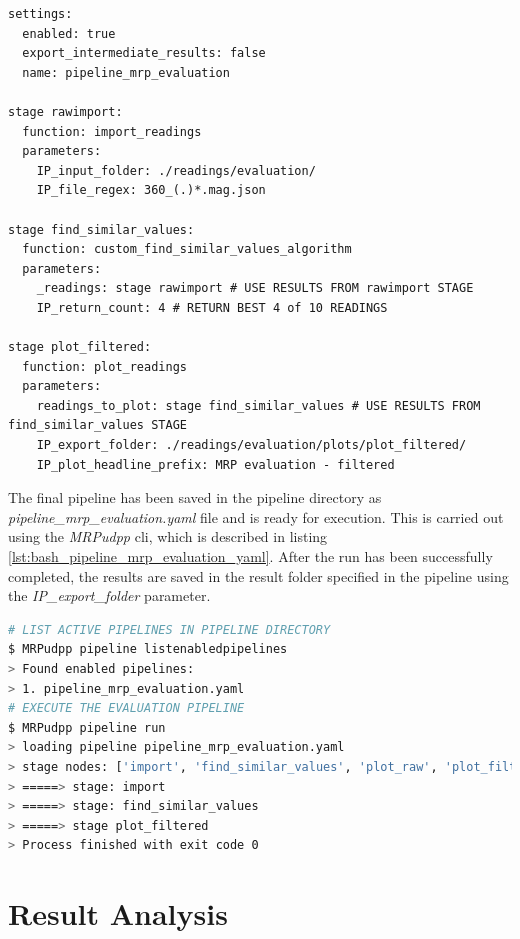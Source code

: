 \begin{lstlisting}[caption={User defined processing pipeline using custom implemented filter algorithm in third stage}, label=lst:pipeline_mrp_evaluation_yaml]
settings:
  enabled: true
  export_intermediate_results: false
  name: pipeline_mrp_evaluation

stage rawimport:
  function: import_readings
  parameters:
    IP_input_folder: ./readings/evaluation/
    IP_file_regex: 360_(.)*.mag.json

stage find_similar_values:
  function: custom_find_similar_values_algorithm
  parameters:
    _readings: stage rawimport # USE RESULTS FROM rawimport STAGE
    IP_return_count: 4 # RETURN BEST 4 of 10 READINGS

stage plot_filtered:
  function: plot_readings
  parameters:
    readings_to_plot: stage find_similar_values # USE RESULTS FROM find_similar_values STAGE
    IP_export_folder: ./readings/evaluation/plots/plot_filtered/
    IP_plot_headline_prefix: MRP evaluation - filtered
\end{lstlisting}

The final pipeline has been saved in the pipeline directory as
\emph{pipeline\_mrp\_evaluation.yaml} file and is ready for execution.
This is carried out using the \emph{MRPudpp} \gls{cli}, which is
described in listing \ref{lst:bash_pipeline_mrp_evaluation_yaml}. After
the run has been successfully completed, the results are saved in the
result folder specified in the pipeline using the
\emph{IP\_export\_folder} parameter.

\begin{lstlisting}[language=bash, caption={Bash result log of the analysis pipeline run}, label=lst:bash_pipeline_mrp_evaluation_yaml]
# LIST ACTIVE PIPELINES IN PIPELINE DIRECTORY 
$ MRPudpp pipeline listenabledpipelines
> Found enabled pipelines:
> 1. pipeline_mrp_evaluation.yaml
# EXECUTE THE EVALUATION PIPELINE
$ MRPudpp pipeline run
> loading pipeline pipeline_mrp_evaluation.yaml
> stage nodes: ['import', 'find_similar_values', 'plot_raw', 'plot_filtered']
> =====> stage: import 
> =====> stage: find_similar_values 
> =====> stage plot_filtered 
> Process finished with exit code 0
\end{lstlisting}

\hypertarget{result-analysis}{%
\section{Result Analysis}\label{result-analysis}}

